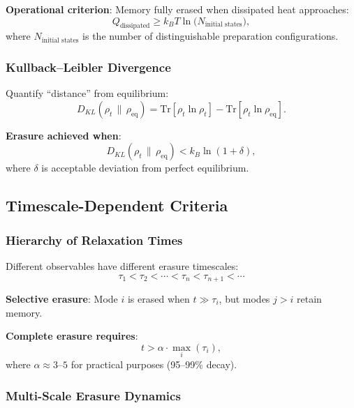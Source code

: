\documentclass[11pt]{article}
\theoremstyle{defstyle}
\theoremstyle{mapstyle}
\begin{document}
\textbf{Operational criterion}: Memory fully erased when dissipated heat approaches:
\begin{equation}
\boxed{Q_{\text{dissipated}} \geq k_B T \ln\!\bigl(N_{\text{initial states}}\bigr),}
\end{equation}
where $N_{\text{initial states}}$ is the number of distinguishable preparation configurations.

\subsubsection{Kullback--Leibler Divergence}

Quantify ``distance'' from equilibrium:
\begin{equation}
D_{KL}(\rho_t \,\|\, \rho_{\text{eq}})
= \text{Tr}[\rho_t \ln \rho_t] - \text{Tr}[\rho_t \ln \rho_{\text{eq}}].
\end{equation}

\textbf{Erasure achieved when}:
\begin{equation}
\boxed{D_{KL}(\rho_t \,\|\, \rho_{\text{eq}}) < k_B \ln(1 + \delta),}
\end{equation}
where $\delta$ is acceptable deviation from perfect equilibrium.

\subsection{Timescale-Dependent Criteria}

\subsubsection{Hierarchy of Relaxation Times}

Different observables have different erasure timescales:
\[
\tau_1 < \tau_2 < \cdots < \tau_n < \tau_{n+1} < \cdots
\]

\textbf{Selective erasure}: Mode $i$ is erased when $t \gg \tau_i$, but modes $j>i$ retain memory.

\textbf{Complete erasure requires}:
\begin{equation}
\boxed{t > \alpha \cdot \max_i(\tau_i),}
\end{equation}
where $\alpha \approx 3$--$5$ for practical purposes (95--99\% decay).

\subsubsection{Multi-Scale Erasure Dynamics}
\end{document}
